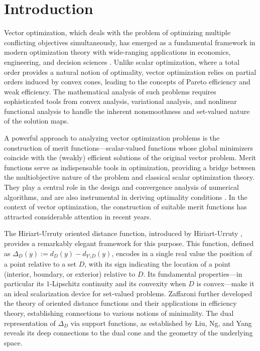 \documentclass[11pt]{article}
\begin{document}
\section{Introduction}
Vector optimization, which deals with the problem of optimizing multiple conflicting objectives simultaneously, has emerged as a fundamental framework in modern optimization theory with wide-ranging applications in economics, engineering, and decision sciences \cite{Ehrgott, Jahn, Luc}. Unlike scalar optimization, where a total order provides a natural notion of optimality, vector optimization relies on partial orders induced by convex cones, leading to the concepts of Pareto efficiency and weak efficiency. The mathematical analysis of such problems requires sophisticated tools from convex analysis, variational analysis, and nonlinear functional analysis to handle the inherent nonsmoothness and set-valued nature of the solution maps.

A powerful approach to analyzing vector optimization problems is the construction of merit functions---scalar-valued functions whose global minimizers coincide with the (weakly) efficient solutions of the original vector problem. Merit functions serve as indispensable tools in optimization, providing a bridge between the multiobjective nature of the problem and classical scalar optimization theory. They play a central role in the design and convergence analysis of numerical algorithms, and are also instrumental in deriving optimality conditions \cite{Fukushima, Hearn, FacchineiPang}.  In the context of vector optimization, the construction of suitable merit functions has attracted considerable attention in recent years. 

The Hiriart-Urruty oriented distance function, introduced by Hiriart-Urruty \cite{Hiriart1, Hiriart2}, provides a remarkably elegant framework for this purpose. This function, defined as \(\Delta_D(y) := d_D(y) - d_{Y\setminus D}(y)\), encodes in a single real value the position of a point relative to a set \(D\), with its sign indicating the location of a point (interior, boundary, or exterior) relative to \(D\). Its fundamental properties---in particular its \(1\)-Lipschitz continuity and its convexity when \(D\) is convex---make it an ideal scalarization device for set-valued problems. Zaffaroni \cite{Zaffaroni2003} further developed the theory of oriented distance functions and their applications in efficiency theory, establishing connections to various notions of minimality. The dual representation of \(\Delta_D\) via support functions, as established by Liu, Ng, and Yang \cite{LiuNgYang2009}   reveals its deep connections to the dual cone and the geometry of the underlying space.
\end{document}
